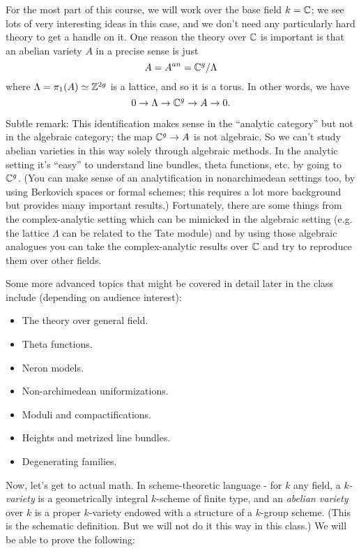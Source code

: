 For the most part of this course, we will work over the base field $k={\mathbb C}$; we see lots of very interesting ideas in this case, and we don't need any particularly hard theory to get a handle on it. One reason the theory over ${\mathbb C}$ is important is that an abelian variety $A$ in a precise sense is just $$A=A^{an}={\mathbb C}^g/\Lambda$$ 
where $\Lambda=\pi_1(A)\simeq {\mathbb Z}^{2g}$ is a lattice, and so it is a torus. In other words, we have
$$0\to \Lambda\to {\mathbb C}^g\to A\to 0.$$

Subtle remark: This identification makes sense in the ``analytic category'' but not in the algebraic category; the map ${\mathbb C}^g\to A$ is not algebraic. So we can't study abelian varieties in this way solely through algebraic methods. In the analytic setting it's ``easy'' to understand line bundles, theta functions, etc. by going to ${\mathbb C}^g$. (You can make sense of an analytification in nonarchimedean settings too, by using Berkovich spaces or formal schemes; this requires a lot more background but provides many important results.) Fortunately, there are some things from the complex-analytic setting which can be mimicked in the algebraic setting (e.g. the lattice $\Lambda$ can be related to the Tate module) and by using those algebraic analogues you can take the complex-analytic results over ${\mathbb C}$ and try to reproduce them over other fields. 

Some more advanced topics that might be covered in detail later in the class include (depending on audience interest):
\begin{itemize}
\item The theory over general field.
\item Theta functions.
\item Neron models.
\item Non-archimedean uniformizations.
\item Moduli and compactifications.
\item Heights and metrized line bundles.
\item Degenerating families.
\end{itemize} 

Now, let's get to actual math. In scheme-theoretic language - 
for $k$ any field, a \emph{$k$-variety} is a geometrically integral $k$-scheme of finite type, and an \emph{abelian variety} over $k$ is a proper $k$-variety endowed with a structure of a $k$-group scheme. (This is the schematic definition. But we will not do it this way in this class.) We will be able to prove the following:

